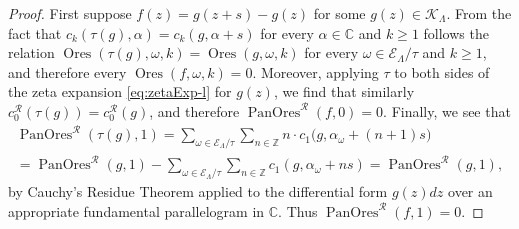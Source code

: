 \documentclass[preprint,12pt]{elsarticle}
\numberwithin{equation}{section} %
\theoremstyle{theorem}
\theoremstyle{definition}
\newcommand{\bk}{\mathcal{K}} %
\newcommand{\bkl}{\bk_{\Lambda}} %
\newcommand{\ec}{\mathcal{E}} %
\newcommand{\ecl}{\ec_{\Lambda}} %
\newcommand{\orbitl}{{\ecl/\tau}} %
\newcommand{\C}{\mathbb{C}} %
\DeclareMathOperator{\ores}{Ores}
\DeclareMathOperator{\pano}{PanOres}
\begin{document}
\begin{proof}
    First suppose $f(z)=g(z+s)-g(z)$ for some $g(z)\in\bkl$. From the fact that $c_k(\tau(g),\alpha)=c_k(g,\alpha+s)$ for every $\alpha\in\C$ and $k\geq 1$ follows the relation $\ores(\tau(g),\omega,k)=\ores(g,\omega,k)$ for every $\omega\in\orbitl$ and $k\geq 1$, and therefore every $\ores(f,\omega,k)=0$. Moreover, applying $\tau$ to both sides of the zeta expansion \eqref{eq:zetaExp-l} for $g(z)$, we find that similarly $c^\mathcal{R}_0(\tau(g))=c^\mathcal{R}_0(g)$, and therefore $\pano^\mathcal{R}(f,0)=0$. Finally, we see that \begin{multline*}\pano^\mathcal{R}(\tau(g),1) =\sum_{\omega\in\orbitl}\sum_{n\in\mathbb{Z}}n\cdot c_1\bigl(g,\alpha_\omega+(n+1)s\bigr) \\
    =\pano^\mathcal{R}(g,1)-\sum_{\omega\in\orbitl}\sum_{n\in\mathbb{Z}}c_1(g,\alpha_\omega+ns)=\pano^\mathcal{R}(g,1),\end{multline*} by Cauchy's Residue Theorem applied to the differential form $g(z)dz$ over an appropriate fundamental parallelogram in $\C$. Thus $\pano^\mathcal{R}(f,1)=0$.


\end{proof}
\end{document}
